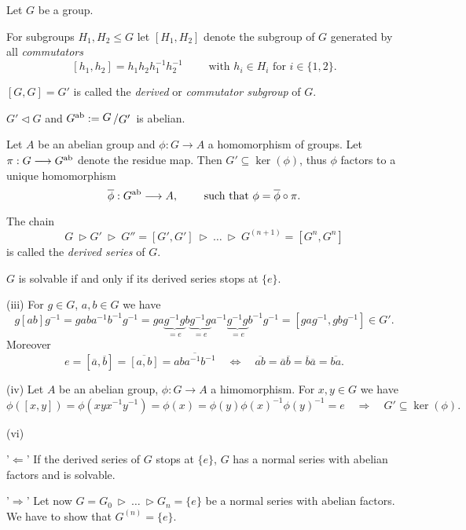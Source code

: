 \documentclass[11pt]{book}
\theoremstyle{nonumberbreak}
\newenvironment{pr}[1][]{\ifthenelse{\equal{#1}{}}{\proof}{\proof[#1]}\rm}{\endproof}
\newenvironment{definbem}[1][]{\ifthenelse{\equal{#1}{}}{\definibem}{\definibem[#1]}\rm}{\enddefinibem}
\newcommand{\slant}[2]{{\raisebox{.1em}{$#1$}\left/\raisebox{-.1em}{$#2$}\right.}}
\begin{document}
\begin{spacing}{1.3}
\begin{definbem} %
Let $G$ be a group.
\begin{compactenum}
\item For subgroups $H_1, H_2 \leqslant G$ let $[H_1, H_2]$ denote the subgroup of $G$ generated by all \textit{commutators}
$$[h_1, h_2]=h_1h_2 h_1^{-1}h_2^{-1}\qquad \textrm { with } h_i \in H_i \textrm{  for } i \in \{1,2\}.$$
\item $[G,G]=G'$ is called the \textit{derived} or \textit{commutator subgroup} of $G$.
\item $G' \triangleleft G$ and $G^{\rm{ab}}:=\slant{G}{G'}$ is abelian.
\item Let $A$ be an abelian group and $\phi:G \longrightarrow A$ a homomorphism of groups. Let $\pi: G \longrightarrow G^{\rm{ab}}$ denote the residue map. Then $G' \subseteq \ker(\phi)$, thus $\phi$ factors to a unique homomorphism
$$\overline{\phi}: G^{\rm{ab}} \longrightarrow A, \qquad \textrm{ such that } \phi= \overline{\phi} \circ \pi.$$
\item The chain 
$$G \ \triangleright G' \ \triangleright \ G''=[G', G'] \ \triangleright \ \ldots \ \triangleright \ G^{(n+1)}=[G^n, G^n]$$
is called the \textit{derived series} of $G$.
\item $G$ is solvable if and only if its derived series stops at $\{e\}$.
\end{compactenum}
\begin{pr}
\begin{compactenum}
\item[(iii)] For $g \in G$, $a,b \in G$ we have
$$g [ab]g^{-1}=gaba^{-1}b^{-1}g^{-1}=ga\underbrace{g^{-1}g}_{=e}b\underbrace{g^{-1}g}_{=e}a^{-1}\underbrace{g^{-1}g}_{=e}b^{-1}g^{-1}=[gag^{-1}, gbg^{-1}] \in G'.$$
Moreover
$$e=[\overline{a}, \overline{b}]=\overline{[a,b]}=\overline{aba^{-1}b^{-1}} \quad \Longleftrightarrow \quad \overline{ab}=\overline{a}\overline{b}=\overline{b}\overline{a}=\overline{ba}.$$
\item[(iv)] Let $A$ be an abelian group, $\phi:G \longrightarrow A$ a himomorphism. For $x,y \in G$ we have
$$\phi([x,y])=\phi(xyx^{-1}y^{-1})=\phi(x)=\phi(y)\phi(x)^{-1}\phi(y)^{-1}=e \quad \Longrightarrow \quad G' \subseteq \ker(\phi).$$
\item[(vi)] \begin{compactitem}
\item['$\Leftarrow$'] If the derived series of $G$ stops at $\{e\}$, $G$ has a normal series with abelian factors and is solvable.
\item['$\Rightarrow$'] Let now $G=G_0 \ \triangleright \ \ldots \ \triangleright G_n=\{e\}$ be a normal series with abelian factors. We have to show that $G^{(n)}=\{e\}$.

\end{compactitem}
\end{compactenum}
\end{pr}
\end{definbem}
\end{spacing}
\end{document}

